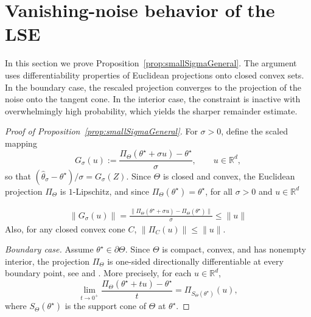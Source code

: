 \documentclass[11pt]{article}
\theoremstyle{plain}
\theoremstyle{definition}
\providecommand{\mathbbm}{\mathbb} %
\newcommand{\R}{\mathbbm{R}}
\newcommand{\hattheta}{\hat{\theta}}
\begin{document}
\section{Vanishing-noise behavior of the LSE}
\label{sec:vanishingnoise}
In this section we prove Proposition~\ref{prop:smallSigmaGeneral}. The argument uses differentiability properties of Euclidean projections onto closed convex sets. In the boundary case, the rescaled projection converges to the projection of the noise onto the tangent cone. In the interior case, the constraint is inactive with overwhelmingly high probability, which yields the sharper remainder estimate.

\begin{proof}[Proof of Proposition~\ref{prop:smallSigmaGeneral}]
For $\sigma>0$, define the scaled mapping
\[
G_\sigma(u):=\frac{\Pi_\Theta(\theta^\star+\sigma u)-\theta^\star}{\sigma},
\qquad u\in\R^d,
\]
so that $(\hattheta_\sigma-\theta^\star)/\sigma=G_\sigma(Z)$. Since $\Theta$ is closed and convex, the Euclidean projection $\Pi_\Theta$ is $1$-Lipschitz, and since $\Pi_\Theta(\theta^\star)=\theta^\star$, for all $\sigma>0$ and $u \in \R^d$

\begin{align}
\|G_\sigma(u)\|
=
\frac{\|\Pi_\Theta(\theta^\star+\sigma u)-\Pi_\Theta(\theta^\star)\|}{\sigma}
\le \|u\|
\tag{$\dagger$}\label{eq:dominate-v2}
\end{align}
Also, for any closed convex cone $C$, $\|\Pi_C(u)\|\le \|u\|$.


\noindent\textit{Boundary case.}
Assume $\theta^\star\in\partial\Theta$. Since $\Theta$ is compact, convex, and has nonempty interior, the projection $\Pi_\Theta$ is one-sided directionally differentiable at every boundary point, see \cite{zarantonello1971projections} and \cite{shapiro2016differentiability}.
More precisely, for each $u\in\R^d$,
\[
\lim_{t\to0^+}\frac{\Pi_\Theta(\theta^\star+t u)-\theta^\star}{t}
=
\Pi_{S_\Theta(\theta^\star)}(u),
\]
where $S_\Theta(\theta^\star)$ is the support cone of $\Theta$ at $\theta^\star$. 


\end{proof}
\end{document}
